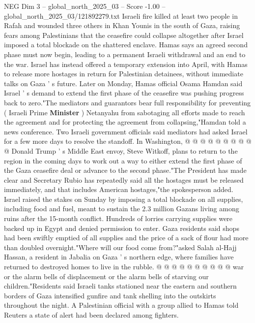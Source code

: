 \begin{textsample}{NEG Dim 3 – global\_north\_2025\_03 – Score -1.00 – global\_north\_2025\_03/121892279.txt}  \label{ex:f3_neg_433}
Israeli fire killed at least two people in Rafah and wounded three others in Khan Younis in the south of Gaza, raising fears among Palestinians that the ceasefire could collapse altogether after Israel imposed a total blockade on the shattered enclave.
Hamas says an agreed second phase must now begin, leading to a permanent Israeli withdrawal and an end to the war.
Israel has instead offered a temporary extension into April, with Hamas to release more hostages in return for Palestinian detainees, without immediate talks on Gaza ' s future.
Later on Monday, Hamas official Osama Hamdan said Israel ' s demand to extend the first phase of the ceasefire was pushing progress back to zero."The mediators and guarantors bear full responsibility for preventing ( Israeli Prime \textbf{Minister} ) Netanyahu from sabotaging all efforts made to reach the agreement and for protecting the agreement from collapsing,"Hamdan told a news conference.
Two Israeli government officials said mediators had asked Israel for a few more days to resolve the standoff.
In Washington, @ @ @ @ @ @ @ @ @ @ Donald Trump ' s Middle East envoy, Steve Witkoff, plans to return to the region in the coming days to work out a way to either extend the first phase of the Gaza ceasefire deal or advance to the second phase."The President has made clear and Secretary Rubio has repeatedly said all the hostages must be released immediately, and that includes American hostages,"the spokesperson added.
Israel raised the stakes on Sunday by imposing a total blockade on all supplies, including food and fuel, meant to sustain the 2.3 million Gazans living among ruins after the 15-month conflict.
Hundreds of lorries carrying supplies were backed up in Egypt and denied permission to enter.
Gaza residents said shops had been swiftly emptied of all supplies and the price of a sack of flour had more than doubled overnight."Where will our food come from?"asked Salah al-Hajj Hassan, a resident in Jabalia on Gaza ' s northern edge, where families have returned to destroyed homes to live in the rubble. @ @ @ @ @ @ @ @ @ @ war or the alarm bells of displacement or the alarm bells of starving our children."Residents said Israeli tanks stationed near the eastern and southern borders of Gaza intensified gunfire and tank shelling into the outskirts throughout the night.
A Palestinian official with a group allied to Hamas told Reuters a state of alert had been declared among fighters.

\end{textsample}
